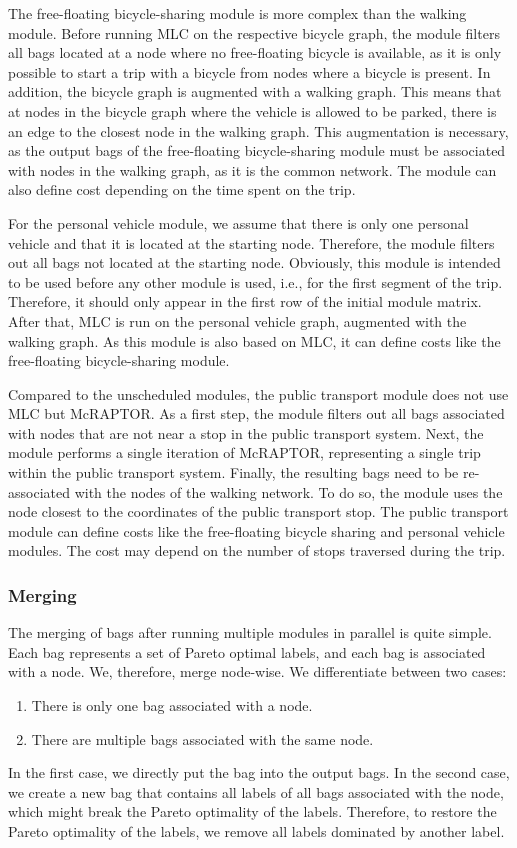 The free-floating bicycle-sharing module is more complex than the walking module.
Before running MLC on the respective bicycle graph, the module filters all bags located at a node where no free-floating bicycle is available, as it is only possible to start a trip with a bicycle from nodes where a bicycle is present.
In addition, the bicycle graph is augmented with a walking graph. 
This means that at nodes in the bicycle graph where the vehicle is allowed to be parked, there is an edge to the closest node in the walking graph.
This augmentation is necessary, as the output bags of the free-floating bicycle-sharing module must be associated with nodes in the walking graph, as it is the common network.
The module can also define cost depending on the time spent on the trip.

For the personal vehicle module, we assume that there is only one personal vehicle and that it is located at the starting node.
Therefore, the module filters out all bags not located at the starting node.
Obviously, this module is intended to be used before any other module is used, i.e., for the first segment of the trip.
Therefore, it should only appear in the first row of the initial module matrix.
After that, MLC is run on the personal vehicle graph, augmented with the walking graph.
As this module is also based on MLC, it can define costs like the free-floating bicycle-sharing module.

Compared to the unscheduled modules, the public transport module does not use MLC but McRAPTOR.
As a first step, the module filters out all bags associated with nodes that are not near a stop in the public transport system.
Next, the module performs a single iteration of McRAPTOR, representing a single trip within the public transport system.
Finally, the resulting bags need to be re-associated with the nodes of the walking network.
To do so, the module uses the node closest to the coordinates of the public transport stop.
The public transport module can define costs like the free-floating bicycle sharing and personal vehicle modules.
The cost may depend on the number of stops traversed during the trip.

\subsubsection{Merging}
\label{subsubsec:merging}

The merging of bags after running multiple modules in parallel is quite simple.
Each bag represents a set of Pareto optimal labels, and each bag is associated with a node.
We, therefore, merge node-wise.
We differentiate between two cases:
\begin{enumerate}
    \item There is only one bag associated with a node.
    \item There are multiple bags associated with the same node.
\end{enumerate}
In the first case, we directly put the bag into the output bags.
In the second case, we create a new bag that contains all labels of all bags associated with the node, which might break the Pareto optimality of the labels.
Therefore, to restore the Pareto optimality of the labels, we remove all labels dominated by another label.

